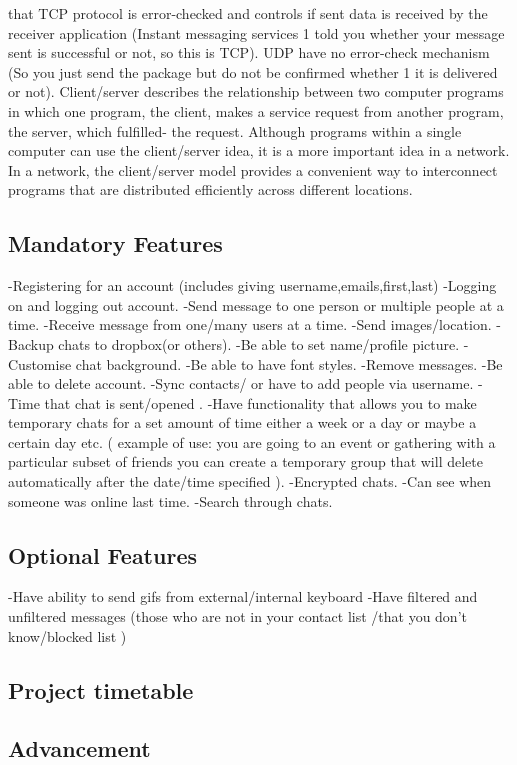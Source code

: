 \documentclass[11pt,a4paper]{article}
\begin{document}
that TCP protocol is error-checked and controls if sent data is received by
the receiver application (Instant messaging services 1 told you whether your
message sent is successful or not, so this is TCP). UDP have no error-check
mechanism (So you just send the package but do not be confirmed whether
1
it is delivered or not). Client/server describes the relationship between two
computer programs in which one program, the client, makes a service request
from another program, the server, which fulfilled- the request. Although
programs within a single computer can use the client/server idea, it is a more
important idea in a network. In a network, the client/server model provides
a convenient way to interconnect programs that are distributed efficiently
across different locations.
\subsection{Mandatory Features}
-Registering for an account (includes giving username,emails,first,last)
-Logging on and logging out account. 
-Send message to one person or multiple people at a time.
-Receive message from one/many users at a time.
-Send images/location.
-Backup chats to dropbox(or others).
-Be able to set name/profile picture. 
-Customise chat background. 
-Be able to have font styles. 
-Remove messages.
-Be able to delete account.
-Sync contacts/ or have to add people via username.
-Time that chat is sent/opened . 
-Have functionality that allows you to make temporary chats for a set amount of time either a week or a day or maybe a certain day etc. ( example of use: you are going to an event or gathering with a particular subset of friends you can create a temporary group that will delete automatically after the date/time specified ).
-Encrypted chats.
-Can see when someone was online last time.
-Search through chats.

\subsection{Optional Features}
-Have ability to send gifs from external/internal keyboard
-Have filtered and unfiltered messages (those who are not in your contact list /that you don't know/blocked list )


\subsection{Project timetable}

\subsection{Advancement}
\end{document}
